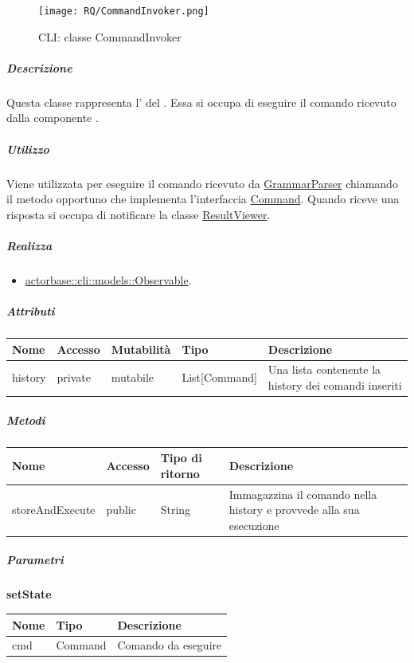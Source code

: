 \documentclass{scalatekids-article}
\begin{document}
\begin{figure}[H]
  \begin{center}
    \texttt{[image: RQ/CommandInvoker.png]}
    \caption{CLI: classe CommandInvoker}
  \end{center}
\end{figure}

\subparagraph{Descrizione}

Questa classe rappresenta l' del . Essa
si occupa di eseguire il comando ricevuto dalla componente .

\subparagraph{Utilizzo}

Viene utilizzata per eseguire il comando ricevuto da
\hyperref[sec:actorbase::cli::controllers::GrammarParser]{GrammarParser} chiamando il metodo opportuno che
implementa l'interfaccia \hyperref[sec:actorbase::cli::models::Command]{Command}.
Quando riceve una risposta si occupa di notificare la classe \hyperref[sec:actorbase::cli::views::ResultViewer]{ResultViewer}.

\subparagraph{Realizza}

\begin{itemize}
\item \hyperref[sec:actorbase::cli::models::Observable]{actorbase::cli::models::Observable}.
\end{itemize}

\subparagraph{Attributi}

\begin{tabular}{| p{2.5cm} | p{1.5cm} | p{2cm} | p{2.5cm} | p{8.5cm} |}
  \hline
  Nome & Accesso & Mutabilità & Tipo & Descrizione\\
  \hline
  history & private & mutabile & List[Command] & Una lista contenente la history dei comandi inseriti\\
  \hline
\end{tabular}

\subparagraph{Metodi}

\begin{tabular}{| l | l | l | l |}
  \hline
  Nome & Accesso & Tipo di ritorno & Descrizione\\
  \hline
  storeAndExecute & public & String & Immagazzina il comando nella history e provvede alla sua esecuzione\\
  \hline
\end{tabular}

\subparagraph{Parametri}

\begin{center}
  \textbf{setState}
\end{center}
\begin{tabular}{| p{3cm} | p{3.5cm} | p{8.5cm} |}
  \hline
  Nome & Tipo & Descrizione\\
  \hline
  cmd & Command & Comando da eseguire\\
  \hline
\end{tabular}
\end{document}
